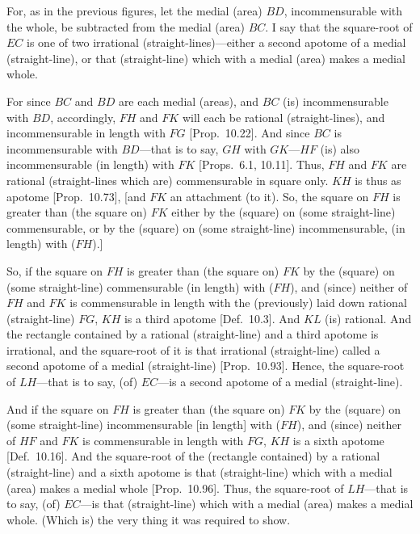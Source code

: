 \begin{Parallel}{}{}
{For, as in the previous figures, let the medial (area) $BD$, incommensurable with the whole, be subtracted from the medial (area) $BC$. I say that
the square-root of $EC$ is one of two irrational (straight-lines)---either
a second apotome of a medial (straight-line), or that (straight-line) which
with a medial (area) makes a medial whole.

\epsfysize=2.2in
\centerline{}

For since $BC$ and $BD$ are each medial (areas), and $BC$ (is) incommensurable with $BD$, accordingly,  $FH$ and $FK$ will each be rational (straight-lines), and incommensurable
in length with $FG$ [Prop.~10.22]. And
since $BC$ is incommensurable with $BD$---that is to say, $GH$ with
$GK$---$HF$ (is) also incommensurable (in length) with $FK$ [Props.~6.1, 10.11]. Thus,
$FH$ and $FK$ are rational (straight-lines which are) commensurable
in square only. $KH$ is thus as apotome [Prop.~10.73], [and $FK$ an attachment (to it).
So, the square on $FH$ is  greater than (the square on)
$FK$ either by the (square) on (some straight-line) commensurable, or by the (square) on (some straight-line) incommensurable, (in length)
with ($FH$).]

So, if the square on $FH$ is greater than (the square on) $FK$ by the
(square) on (some straight-line) commensurable (in length) with ($FH$),
and (since) neither of $FH$ and $FK$ is commensurable in length with
the (previously) laid down rational (straight-line) $FG$, $KH$ is a
third apotome [Def.~10.3]. And $KL$ (is) rational.
And the rectangle contained by a rational (straight-line) and a third
apotome is irrational, and the square-root of it is that irrational (straight-line)
called a second apotome of a medial (straight-line) [Prop.~10.93]. Hence, the square-root of $LH$---that is to say, (of) $EC$---is a second apotome of a medial (straight-line).

And if the square on $FH$ is greater than (the square on) $FK$ by the
(square) on (some straight-line) incommensurable [in length] with ($FH$), 
and (since) neither of $HF$ and $FK$ is commensurable in length
with $FG$, $KH$ is a sixth apotome [Def.~10.16].
And the square-root of the (rectangle contained) by a rational (straight-line) and a sixth apotome is that (straight-line) which with a medial (area)
makes a medial whole [Prop.~10.96]. Thus,
the square-root of $LH$---that is to say, (of) $EC$---is 
that (straight-line) which with a medial (area) makes a medial whole.
(Which is) the very thing it was required to show.}
\end{Parallel}

